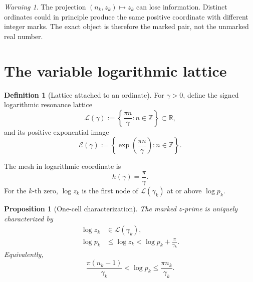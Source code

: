 \documentclass[11pt]{amsart}
\numberwithin{equation}{section}
\theoremstyle{plain}
\newtheorem{proposition}[theorem]{Proposition}
\theoremstyle{definition}
\newtheorem{definition}[theorem]{Definition}
\theoremstyle{remark}
\newtheorem{warning}[theorem]{Warning}
\begin{document}
\begin{warning}
\label{warn:unmarked_projection}
The projection $(n_k,z_k)\mapsto z_k$ can lose information.  Distinct
ordinates could in principle produce the same positive coordinate with
different integer marks.  The exact object is therefore the marked pair, not
the unmarked real number.
\end{warning}

\section{The variable logarithmic lattice}
\label{sec:variable_lattice}

\begin{definition}[Lattice attached to an ordinate]
\label{def:lattice_attached_ordinate}
For $\gamma>0$, define the signed logarithmic resonance lattice
\begin{equation}
 \mathcal L(\gamma)
 :=\left\{\frac{\pi n}{\gamma}:n\in\mathbb Z\right\}
 \subset\mathbb R,
 \label{eq:log_lattice_definition}
\end{equation}
and its positive exponential image
\begin{equation}
 \mathcal E(\gamma)
 :=\left\{\exp\left(\frac{\pi n}{\gamma}\right):n\in\mathbb Z\right\}.
 \label{eq:exponential_lattice_definition}
\end{equation}
\end{definition}

The mesh in logarithmic coordinate is
\begin{equation}
 h(\gamma)=\frac{\pi}{\gamma}.
 \label{eq:lattice_mesh}
\end{equation}
For the $k$-th zero, $\log z_k$ is the first node of
$\mathcal L(\gamma_k)$ at or above $\log p_k$.

\begin{proposition}[One-cell characterization]
\label{prop:one_cell_characterization}
The marked $z$-prime is uniquely characterized by
\begin{align}
 \log z_k&\in\mathcal L(\gamma_k),
 \label{eq:one_cell_membership}
 \\
 \log p_k&\leq\log z_k<\log p_k+\frac{\pi}{\gamma_k}.
 \label{eq:one_cell_interval}
\end{align}
Equivalently,
\begin{equation}
 \frac{\pi(n_k-1)}{\gamma_k}
 <\log p_k
 \leq\frac{\pi n_k}{\gamma_k}.
 \label{eq:cell_index_inequality}
\end{equation}
\end{proposition}
\end{document}

